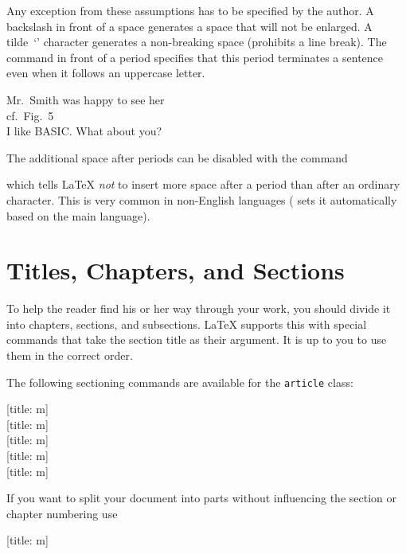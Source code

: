 Any exception from these assumptions has to be specified by the author. A
backslash in front of a space generates a space that will not be enlarged. A
tilde~\enquote*{\ai{\~}} character generates a non-breaking space (prohibits a
line break). The command  in front of a period specifies that this
period terminates a sentence even when it follows an uppercase letter.
\ai{\~}%

\begin{example}
Mr.~Smith was happy to see her\\
cf.~Fig.~5\\
I like BASIC\@. What about you?
\end{example}

The additional space after periods can be disabled with the command
\begin{lscommand}
\end{lscommand}
which tells \LaTeX{} \emph{not} to insert more space after a period than after
an ordinary character. This is very common in non-English languages
( sets it automatically based on the main language).

\section{Titles, Chapters, and Sections}

To help the reader find his or her way through your work, you should
divide it into chapters, sections, and subsections.  \LaTeX{} supports
this with special commands that take the section title as their
argument.  It is up to you to use them in the correct order.

The following sectioning commands are available for the
\texttt{article} class: \nopagebreak

\begin{lscommand}
  [title: m]\\
  [title: m]\\
  [title: m]\\
  [title: m]\\
  [title: m]
\end{lscommand}

If you want to split your document into parts without influencing the
section or chapter numbering use
\begin{lscommand}
  [title: m]
\end{lscommand}


